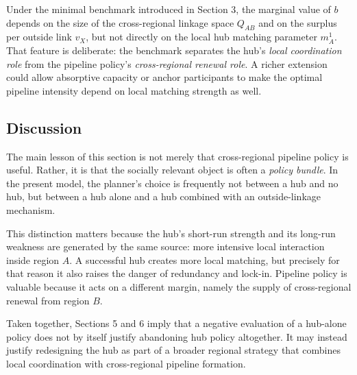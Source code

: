 Under the minimal benchmark introduced in Section 3, the marginal value of $b$ depends on the size of the cross-regional linkage space $Q_{AB}$ and on the surplus per outside link $v_X$, but not directly on the local hub matching parameter $m_A^1$. That feature is deliberate: the benchmark separates the hub's \emph{local coordination role} from the pipeline policy's \emph{cross-regional renewal role}. A richer extension could allow absorptive capacity or anchor participants to make the optimal pipeline intensity depend on local matching strength as well.

\subsection{Discussion}

The main lesson of this section is not merely that cross-regional pipeline policy is useful. Rather, it is that the socially relevant object is often a \emph{policy bundle}. In the present model, the planner's choice is frequently not between a hub and no hub, but between a hub alone and a hub combined with an outside-linkage mechanism.

This distinction matters because the hub's short-run strength and its long-run weakness are generated by the same source: more intensive local interaction inside region $A$. A successful hub creates more local matching, but precisely for that reason it also raises the danger of redundancy and lock-in. Pipeline policy is valuable because it acts on a different margin, namely the supply of cross-regional renewal from region $B$.

Taken together, Sections 5 and 6 imply that a negative evaluation of a hub-alone policy does not by itself justify abandoning hub policy altogether. It may instead justify redesigning the hub as part of a broader regional strategy that combines local coordination with cross-regional pipeline formation.

